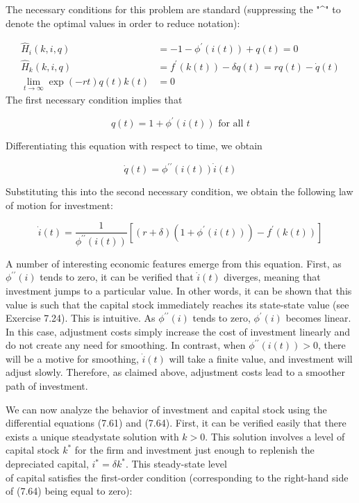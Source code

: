 \documentclass[\topdir/lecture_notes.tex]{subfiles}
\begin{document}
The necessary conditions for this problem are standard (suppressing the "\^{}" to denote the optimal values in order to reduce notation):

\[
\begin{aligned}
\hat{H}_{i}(k, i, q) & =-1-\phi^{\prime}(i(t))+q(t)=0 \\
\hat{H}_{k}(k, i, q) & =f^{\prime}(k(t))-\delta q(t)=r q(t)-\dot{q}(t) \\
\lim _{t \rightarrow \infty} \exp (-r t) q(t) k(t) & =0
\end{aligned}
\]
The first necessary condition implies that

\[
q(t)=1+\phi^{\prime}(i(t)) \text { for all } t
\]

Differentiating this equation with respect to time, we obtain

\[
\dot{q}(t)=\phi^{\prime \prime}(i(t)) \dot{i}(t)
\]

Substituting this into the second necessary condition, we obtain the following law of motion for investment:

\[
\dot{i}(t)=\frac{1}{\phi^{\prime \prime}(i(t))}\left[(r+\delta)\left(1+\phi^{\prime}(i(t))\right)-f^{\prime}(k(t))\right]
\]

A number of interesting economic features emerge from this equation. First, as $\phi^{\prime \prime}(i)$ tends to zero, it can be verified that $\dot{i}(t)$ diverges, meaning that investment jumps to a particular value. In other words, it can be shown that this value is such that the capital stock immediately reaches its state-state value (see Exercise 7.24). This is intuitive. As $\phi^{\prime \prime}(i)$ tends to zero, $\phi^{\prime}(i)$ becomes linear. In this case, adjustment costs simply increase the cost of investment linearly and do not create any need for smoothing. In contrast, when $\phi^{\prime \prime}(i(t))>0$, there will be a motive for smoothing, $\dot{i}(t)$ will take a finite value, and investment will adjust slowly. Therefore, as claimed above, adjustment costs lead to a smoother path of investment.

We can now analyze the behavior of investment and capital stock using the differential equations (7.61) and (7.64). First, it can be verified easily that there exists a unique steadystate solution with $k>0$. This solution involves a level of capital stock $k^{*}$ for the firm and investment just enough to replenish the depreciated capital, $i^{*}=\delta k^{*}$. This steady-state level\\
of capital satisfies the first-order condition (corresponding to the right-hand side of (7.64) being equal to zero):
\end{document}
